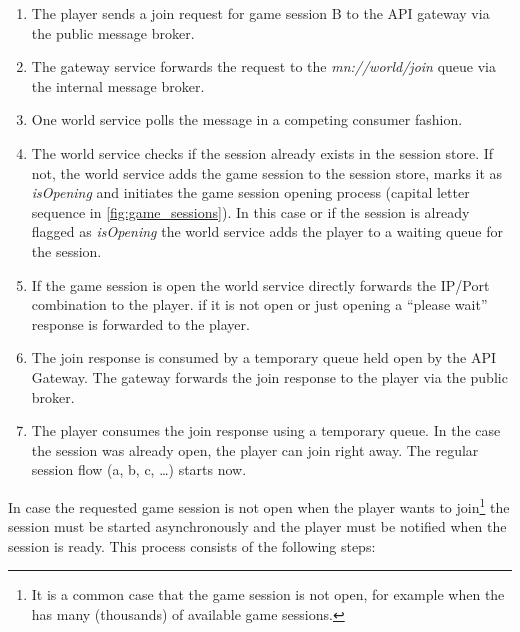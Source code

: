 \begin{enumerate}
  \item The player sends a join request for game session B to the API
  gateway via the public message broker.
  \item The gateway service forwards the request to the \textit{mn://world/join}
  queue via the internal message broker.
  \item One world service polls the message in a competing consumer fashion.
  \item The world service checks if the session already exists in the session
  store. If not, the world service adds the game session to the session store,
  marks it as \textit{isOpening} and initiates the game session opening process (capital
  letter sequence in \autoref{fig:game_sessions}). In this case or if the
  session is already flagged as \textit{isOpening} the world service adds the
  player to a waiting queue for the session.
  \item If the game session is open the world service directly
  forwards the IP/Port combination to the player.  if it is not open or
  just opening a ``please wait'' response is forwarded to the player.
  \item The join response is consumed by a temporary queue held open by
  the API Gateway. The gateway forwards the join response to the player
  via the public broker.
  \item The player consumes the join response using a temporary queue.
  In the case the session was already open, the player can join right away. The regular
  session flow (a, b, c, \ldots) starts now.
\end{enumerate}

In case the requested game session is not open when the player wants to
join\footnote{It is a common case that the game session is not open, for
example when the \og{} has many (thousands) of available game sessions.} the
session must be started asynchronously and the player must be notified when the
session is ready. This process consists of the following steps:



